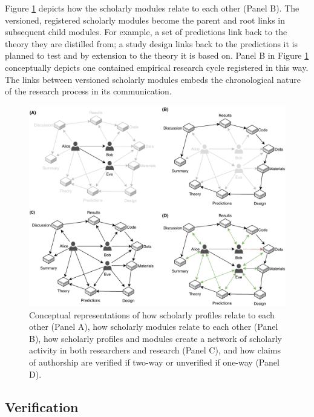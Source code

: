 \documentclass[publications,article,submit,moreauthors,pdftex,10pt,a4paper]{Definitions/mdpi}
\begin{document}
Figure \ref{fig:datcom-fig4} depicts how the scholarly modules relate to
each other (Panel B). The versioned, registered scholarly modules become
the parent and root links in subsequent child modules. For example, a
set of predictions link back to the theory they are distilled from; a
study design links back to the predictions it is planned to test and by
extension to the theory it is based on. Panel B in Figure
\ref{fig:datcom-fig4} conceptually depicts one contained empirical
research cycle registered in this way. The links between versioned
scholarly modules embeds the chronological nature of the research
process in its communication.

\begin{figure}

{\centering \includegraphics[width=1\linewidth]{fig4} 

}

\caption{Conceptual representations of how scholarly profiles relate to each other (Panel A), how scholarly modules relate to each other (Panel B), how scholarly profiles and modules create a network of scholarly activity in both researchers and research (Panel C), and how claims of authorship are verified if two-way or unverified if one-way (Panel D).}\label{fig:datcom-fig4}
\end{figure}

\subsection*{Verification}\label{verification}
\end{document}
